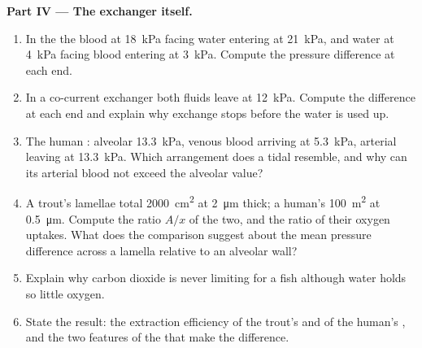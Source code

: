 \begin{problem}
\medskip
\noindent\textbf{Part IV --- The exchanger itself.}
\begin{enumerate}[resume]
  \item In the   the blood  at \qty{18}{kPa}
        facing water entering at \qty{21}{kPa}, and water  at
        \qty{4}{kPa} facing blood entering at \qty{3}{kPa}. Compute
        the pressure difference at each end.
  \item In a co-current exchanger both fluids leave at \qty{12}{kPa}.
        Compute the difference at each end and explain why exchange
        stops before the water is used up.
  \item The human : alveolar \qty{13.3}{kPa}, venous blood
        arriving at \qty{5.3}{kPa}, arterial leaving at \qty{13.3}{kPa}.
        Which arrangement does a tidal  resemble, and why can its
        arterial blood not exceed the alveolar value?
  \item A trout's lamellae total \qty{2000}{cm^2} at \qty{2}{\micro m}
        thick; a human's  \qty{100}{m^2} at \qty{0.5}{\micro m}.
        Compute the ratio $A/x$ of the two, and the ratio of their
        oxygen uptakes. What does the comparison suggest about the
        mean pressure difference across a lamella relative to an
        alveolar wall?
  \item Explain why carbon dioxide is never limiting for a fish
        although water holds so little oxygen.
  \item State the result: the extraction efficiency of the trout's
         and of the human's , and the two features of the 
        that make the difference.
\end{enumerate}
\end{problem}
